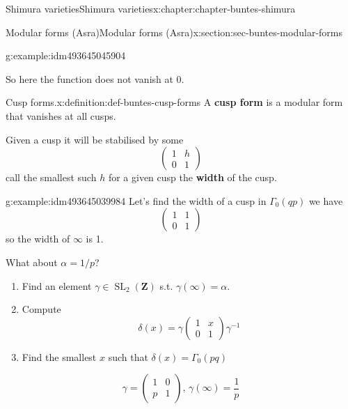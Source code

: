 \documentclass[oneside,10pt,]{book}
\newcommand{\terminology}[1]{\textbf{#1}}
\numberwithin{equation}{section}
\newcommand{\inv}{^{-1}}
\newcommand{\ZZ}{\mathbf{Z}}
\DeclareMathOperator{\SL}{SL}
\newcommand{\amp}{&}
\begin{document}
\begin{chapterptx}{Shimura varieties}{}{Shimura varieties}{}{}{x:chapter:chapter-buntes-shimura}
\begin{sectionptx}{Modular forms (Asra)}{}{Modular forms (Asra)}{}{}{x:section:sec-buntes-modular-forms}
\begin{example}{}{g:example:idm493645045904}
\begin{equation*}
\end{equation*}
%
\par
So here the function does not vanish at 0.%
\end{example}
\begin{definition}{Cusp forms.}{x:definition:def-buntes-cusp-forms}%
A \terminology{cusp form} is a modular form that vanishes at all cusps.%
\end{definition}
Given a cusp it will be stabilised by some%
\begin{equation*}
\begin{pmatrix} 1\amp h \\ 0 \amp 1 \end{pmatrix}
\end{equation*}
call the smallest such \(h\) for a given cusp the \terminology{width} of the cusp.%
\begin{example}{}{g:example:idm493645039984}%
Let's find the width of a cusp in \(\Gamma_0(qp)\) we have%
\begin{equation*}
\begin{pmatrix} 1\amp 1 \\ 0 \amp 1 \end{pmatrix}
\end{equation*}
so the width of \(\infty\) is 1.%
\par
What about \(\alpha = 1/p\)?%
\begin{enumerate}
\item{}Find an element \(\gamma \in \SL_2(\ZZ)\) s.t. \(\gamma(\infty) = \alpha\).%
\item{}Compute%
\begin{equation*}
\delta(x) = \gamma \begin{pmatrix} 1\amp x \\ 0 \amp 1 \end{pmatrix} \gamma\inv
\end{equation*}
%
\item{}Find the smallest \(x\) such that \(\delta(x) = \Gamma_0(pq)\)%
\end{enumerate}
%
\begin{equation*}
\gamma = \begin{pmatrix} 1\amp 0 \\ p \amp 1 \end{pmatrix},\, \gamma(\infty) = \frac 1p
\end{equation*}
%
\begin{equation*}

\end{equation*}
\end{example}
\end{sectionptx}
\end{chapterptx}
\end{document}
